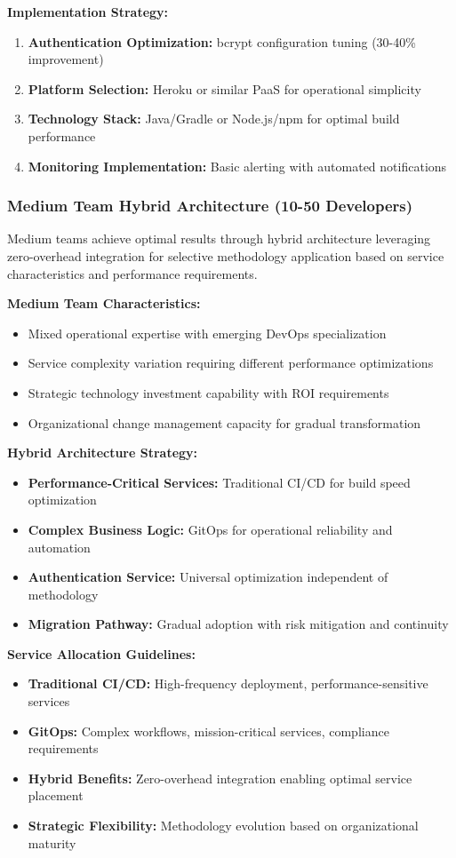 \textbf{Implementation Strategy:}
\begin{enumerate}
\item \textbf{Authentication Optimization:} bcrypt configuration tuning (30-40\% improvement)
\item \textbf{Platform Selection:} Heroku or similar PaaS for operational simplicity
\item \textbf{Technology Stack:} Java/Gradle or Node.js/npm for optimal build performance
\item \textbf{Monitoring Implementation:} Basic alerting with automated notifications
\end{enumerate}

\subsubsection{Medium Team Hybrid Architecture (10-50 Developers)}

Medium teams achieve optimal results through hybrid architecture leveraging zero-overhead integration for selective methodology application based on service characteristics and performance requirements.

\textbf{Medium Team Characteristics:}
\begin{itemize}
\item Mixed operational expertise with emerging DevOps specialization
\item Service complexity variation requiring different performance optimizations
\item Strategic technology investment capability with ROI requirements
\item Organizational change management capacity for gradual transformation
\end{itemize}

\textbf{Hybrid Architecture Strategy:}
\begin{itemize}
\item \textbf{Performance-Critical Services:} Traditional CI/CD for build speed optimization
\item \textbf{Complex Business Logic:} GitOps for operational reliability and automation
\item \textbf{Authentication Service:} Universal optimization independent of methodology
\item \textbf{Migration Pathway:} Gradual adoption with risk mitigation and continuity
\end{itemize}

\textbf{Service Allocation Guidelines:}
\begin{itemize}
\item \textbf{Traditional CI/CD:} High-frequency deployment, performance-sensitive services
\item \textbf{GitOps:} Complex workflows, mission-critical services, compliance requirements
\item \textbf{Hybrid Benefits:} Zero-overhead integration enabling optimal service placement
\item \textbf{Strategic Flexibility:} Methodology evolution based on organizational maturity
\end{itemize}

